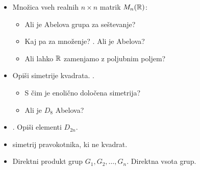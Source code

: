 \begin{enumerate}
\begin{itemize}
        \item Množica vseh realnih $n \times n$ matrik $M_n(\mathbb{R})$:
        \begin{itemize}
            \item Ali je Abelova grupa za seštevanje?
            \item Kaj pa za množenje? . Ali je Abelova?
            \item Ali lahko $\mathbb{R}$ zamenjamo z poljubnim poljem?
        \end{itemize}
        \item Opiši simetrije kvadrata. . 
        \begin{itemize}
            \item S čim je enolično določena simetrija?
            \item Ali je $D_8$ Abelova?
        \end{itemize}
        \item {}. Opiši elementi $D_{2n}$.
        \item {} simetrij pravokotnika, ki ne kvadrat.
        \item Direktni produkt grup $G_1, G_2, \ldots, G_n$. Direktna vsota grup.
    \end{itemize}


\end{enumerate}
